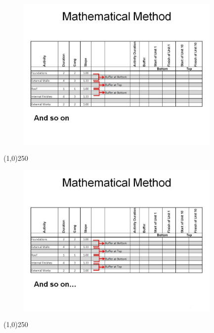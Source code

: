 \begin{frame}
\begin{figure}
	\centering
		\includegraphics[width = 10.0cm]{oldnotes/Slide277.jpg}
\end{figure}
\end{frame}
\begin{center}\line(1,0){250}\end{center}






\begin{frame}
\begin{figure}
	\centering
		\includegraphics[width = 10.0cm]{oldnotes/Slide278.jpg}
\end{figure}
\end{frame}
\begin{center}\line(1,0){250}\end{center}






